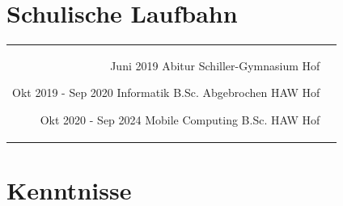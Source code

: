 \documentclass[
	10pt, %
]{FreemanCV}
\begin{document}
\begin{paracol}{2}
\section{Schulische Laufbahn}





\begin{supertabular}{r l} %


	\qualificationentry
	{Juni 2019} %
	{Abitur} %
	{} %
	{} %
	{Schiller-Gymnasium Hof} %


	\qualificationentry
	{Okt 2019 - Sep 2020} %
	{Informatik B.Sc.} %
	{Abgebrochen} %
	{} %
	{HAW Hof} %


	\qualificationentry
	{Okt 2020 - Sep 2024} %
	{Mobile Computing B.Sc.} %
	{} %
	{} %
	{HAW Hof} %


\end{supertabular}
\section{Kenntnisse}








\end{paracol}
\end{document}
